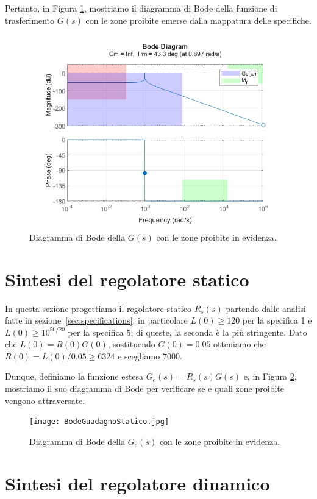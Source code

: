 \documentclass[a4paper, 11pt]{article}
\begin{document}
	Pertanto, in Figura \ref{fig:patchedG}, mostriamo il diagramma di Bode della funzione di trasferimento $G(s)$ con le zone proibite emerse dalla mappatura delle specifiche.
	
	\begin{figure}[h!]
		\centering
		\includegraphics[width=0.7\linewidth]{BodeDiagramWithPatch2025.jpg}
		\caption{Diagramma di Bode della $G(s)$ con le zone proibite in evidenza.}
		\label{fig:patchedG}
	\end{figure}
	
	\newpage
	
	\section{Sintesi del regolatore statico}
	\label{sec:static_regulator}
	
	In questa sezione progettiamo il regolatore statico $R_s(s)$ partendo dalle analisi fatte in sezione~\ref{sec:specifications}: in particolare $L(0) \ge 120$ per la specifica 1 e $L(0) \ge 10^{50/20}$ per la specifica 5; di queste, la seconda è la più stringente. Dato che $L(0) = R(0)G(0)$, sostituendo $G(0) = 0.05$ otteniamo che $R(0) = L(0)/0.05 \ge 6324$ e scegliamo 7000.
	
	Dunque, definiamo la funzione estesa $G_e(s) = R_s(s)G(s)$ e, in Figura \ref{fig:Ge}, mostriamo il suo diagramma di Bode per verificare se e quali zone proibite vengono attraversate.
	
	\begin{figure}[h!]
		\centering
		\texttt{[image: BodeGuadagnoStatico.jpg]}
		\caption{Diagramma di Bode della $G_e(s)$ con le zone proibite in evidenza.}
		\label{fig:Ge}
	\end{figure}
	
	\newpage
	
	\section{Sintesi del regolatore dinamico}
	
\end{document}
